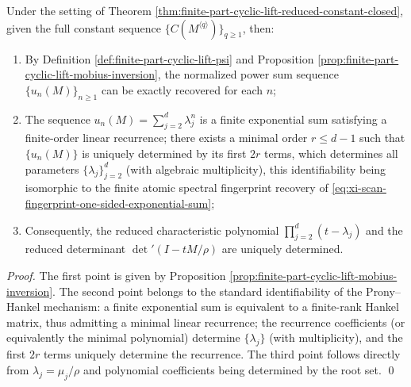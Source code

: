 \begin{theorem}\label{thm:finite-part-cyclic-lift-spectrum-identifiability}
Under the setting of Theorem \ref{thm:finite-part-cyclic-lift-reduced-constant-closed}, given the full constant sequence \(\{C(M^{\langle q\rangle})\}_{q\ge 1}\), then:
\begin{enumerate}
  \item By Definition \ref{def:finite-part-cyclic-lift-psi} and Proposition \ref{prop:finite-part-cyclic-lift-mobius-inversion}, the normalized power sum sequence \(\{u_n(M)\}_{n\ge 1}\) can be exactly recovered for each \(n\);
  \item The sequence \(u_n(M)=\sum_{j=2}^{d}\lambda_j^n\) is a finite exponential sum satisfying a finite-order linear recurrence; there exists a minimal order \(r\le d-1\) such that \(\{u_n(M)\}\) is uniquely determined by its first \(2r\) terms, which determines all parameters \(\{\lambda_j\}_{j=2}^{d}\) (with algebraic multiplicity), this identifiability being isomorphic to the finite atomic spectral fingerprint recovery of \eqref{eq:xi-scan-fingerprint-one-sided-exponential-sum};
  \item Consequently, the reduced characteristic polynomial \(\prod_{j=2}^{d}(t-\lambda_j)\) and the reduced determinant \(\det\nolimits'(I-tM/\rho)\) are uniquely determined.
\end{enumerate}
\end{theorem}
\begin{proof}
The first point is given by Proposition \ref{prop:finite-part-cyclic-lift-mobius-inversion}.
The second point belongs to the standard identifiability of the Prony--Hankel mechanism: a finite exponential sum is equivalent to a finite-rank Hankel matrix, thus admitting a minimal linear recurrence; the recurrence coefficients (or equivalently the minimal polynomial) determine \(\{\lambda_j\}\) (with multiplicity), and the first \(2r\) terms uniquely determine the recurrence.
The third point follows directly from \(\lambda_j=\mu_j/\rho\) and polynomial coefficients being determined by the root set. \qed
\end{proof}

